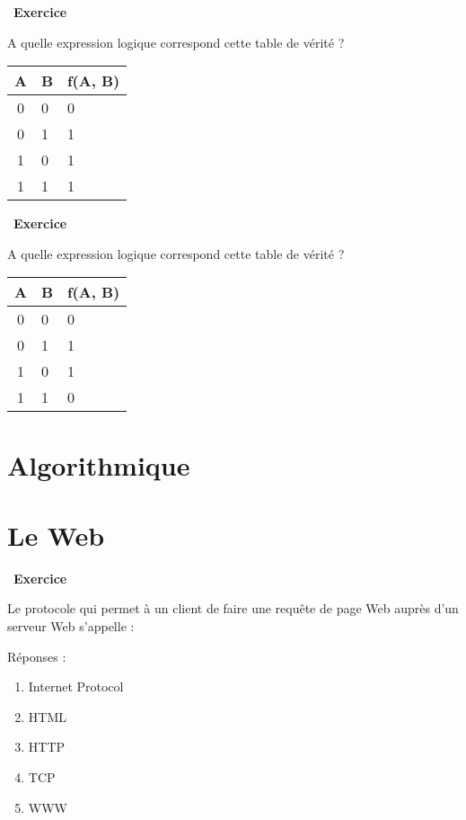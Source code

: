\documentclass[
  11pt,
]{article}
\providecommand{\tightlist}{%
  \setlength{\itemsep}{0pt}\setlength{\parskip}{0pt}}
\newcounter{exo}
\newenvironment{exercice}[1]
{\par \medskip   \addtocounter{exo}{1} \noindent  
\begin{bclogo}[arrondi =0.1,   noborder = true, logo=\bccrayon, marge=4]{~\textbf{Exercice} \textbf{\theexo} {\itshape #1} }  \par}
{
\end{bclogo}
 \par \bigskip }
\newcounter{def}
\newcounter{alg}
\newcounter{logi}
\begin{document}
\begin{exercice}{}

A quelle expression logique correspond cette table de vérité ?

\begin{longtable}[]{@{}cll@{}}
\toprule
A & B & f(A, B)\tabularnewline
\midrule
\endhead
0 & 0 & 0\tabularnewline
0 & 1 & 1\tabularnewline
1 & 0 & 1\tabularnewline
1 & 1 & 1\tabularnewline
\bottomrule
\end{longtable}

\end{exercice}

\begin{exercice}{}

A quelle expression logique correspond cette table de vérité ?

\begin{longtable}[]{@{}cll@{}}
\toprule
A & B & f(A, B)\tabularnewline
\midrule
\endhead
0 & 0 & 0\tabularnewline
0 & 1 & 1\tabularnewline
1 & 0 & 1\tabularnewline
1 & 1 & 0\tabularnewline
\bottomrule
\end{longtable}

\end{exercice}

\hypertarget{algorithmique}{%
\section{Algorithmique}\label{algorithmique}}

\hypertarget{le-web}{%
\section{Le Web}\label{le-web}}

\begin{exercice}{}

Le protocole qui permet à un client de faire une requête de page Web
auprès d'un serveur Web s'appelle :

Réponses :

\begin{enumerate}
\def\labelenumi{\arabic{enumi}.}
\tightlist
\item
  Internet Protocol
\item
  HTML
\item
  HTTP
\item
  TCP
\item
  WWW
\end{enumerate}

\end{exercice}
\end{document}
